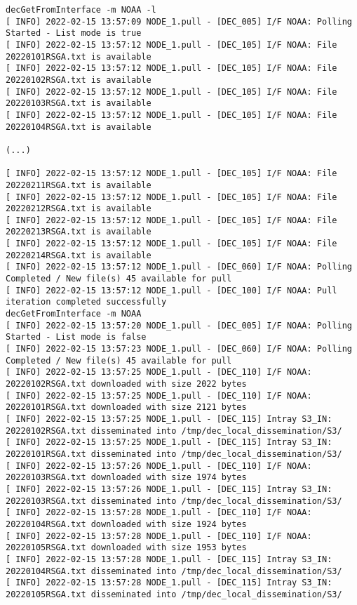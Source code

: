 \documentclass[dec_sum_main.tex]{subfiles}
\begin{document}
	
	 \newline
	
	\begin{Verbatim}[fontsize=\tiny]
decGetFromInterface -m NOAA -l
[ INFO] 2022-02-15 13:57:09 NODE_1.pull - [DEC_005] I/F NOAA: Polling Started - List mode is true
[ INFO] 2022-02-15 13:57:12 NODE_1.pull - [DEC_105] I/F NOAA: File 20220101RSGA.txt is available
[ INFO] 2022-02-15 13:57:12 NODE_1.pull - [DEC_105] I/F NOAA: File 20220102RSGA.txt is available
[ INFO] 2022-02-15 13:57:12 NODE_1.pull - [DEC_105] I/F NOAA: File 20220103RSGA.txt is available
[ INFO] 2022-02-15 13:57:12 NODE_1.pull - [DEC_105] I/F NOAA: File 20220104RSGA.txt is available

(...)

[ INFO] 2022-02-15 13:57:12 NODE_1.pull - [DEC_105] I/F NOAA: File 20220211RSGA.txt is available
[ INFO] 2022-02-15 13:57:12 NODE_1.pull - [DEC_105] I/F NOAA: File 20220212RSGA.txt is available
[ INFO] 2022-02-15 13:57:12 NODE_1.pull - [DEC_105] I/F NOAA: File 20220213RSGA.txt is available
[ INFO] 2022-02-15 13:57:12 NODE_1.pull - [DEC_105] I/F NOAA: File 20220214RSGA.txt is available
[ INFO] 2022-02-15 13:57:12 NODE_1.pull - [DEC_060] I/F NOAA: Polling Completed / New file(s) 45 available for pull
[ INFO] 2022-02-15 13:57:12 NODE_1.pull - [DEC_100] I/F NOAA: Pull iteration completed successfully
decGetFromInterface -m NOAA
[ INFO] 2022-02-15 13:57:20 NODE_1.pull - [DEC_005] I/F NOAA: Polling Started - List mode is false
[ INFO] 2022-02-15 13:57:23 NODE_1.pull - [DEC_060] I/F NOAA: Polling Completed / New file(s) 45 available for pull
[ INFO] 2022-02-15 13:57:25 NODE_1.pull - [DEC_110] I/F NOAA: 20220102RSGA.txt downloaded with size 2022 bytes
[ INFO] 2022-02-15 13:57:25 NODE_1.pull - [DEC_110] I/F NOAA: 20220101RSGA.txt downloaded with size 2121 bytes
[ INFO] 2022-02-15 13:57:25 NODE_1.pull - [DEC_115] Intray S3_IN: 20220102RSGA.txt disseminated into /tmp/dec_local_dissemination/S3/
[ INFO] 2022-02-15 13:57:25 NODE_1.pull - [DEC_115] Intray S3_IN: 20220101RSGA.txt disseminated into /tmp/dec_local_dissemination/S3/
[ INFO] 2022-02-15 13:57:26 NODE_1.pull - [DEC_110] I/F NOAA: 20220103RSGA.txt downloaded with size 1974 bytes
[ INFO] 2022-02-15 13:57:26 NODE_1.pull - [DEC_115] Intray S3_IN: 20220103RSGA.txt disseminated into /tmp/dec_local_dissemination/S3/
[ INFO] 2022-02-15 13:57:28 NODE_1.pull - [DEC_110] I/F NOAA: 20220104RSGA.txt downloaded with size 1924 bytes
[ INFO] 2022-02-15 13:57:28 NODE_1.pull - [DEC_110] I/F NOAA: 20220105RSGA.txt downloaded with size 1953 bytes
[ INFO] 2022-02-15 13:57:28 NODE_1.pull - [DEC_115] Intray S3_IN: 20220104RSGA.txt disseminated into /tmp/dec_local_dissemination/S3/
[ INFO] 2022-02-15 13:57:28 NODE_1.pull - [DEC_115] Intray S3_IN: 20220105RSGA.txt disseminated into /tmp/dec_local_dissemination/S3/


\end{Verbatim}
\end{document}
